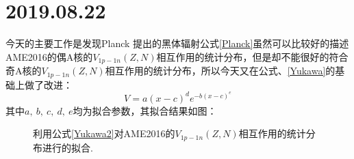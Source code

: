 \section{2019.08.22}
今天的主要工作是发现Planck 提出的黑体辐射公式\ref{Planck}虽然可以比较好的描述AME2016的偶A核的$V_{1p-1n}(Z,N)$相互作用的统计分布，但是却不能很好的符合奇A核的$V_{1p-1n}(Z,N)$相互作用的统计分布，所以今天又在公式、\ref{Yukawa}的基础上做了改进：
\begin{equation}
V=a(x-c)^de^{-b(x-c)^e}\label{Yukawa2}
\end{equation}
其中$a,~b,~c,~d,~e$均为拟合参数，其拟合结果如图：
\begin{figure}[H]
\centering
{}
\qquad
{}
\caption{利用公式\ref{Yukawa2}对AME2016的$V_{1p-1n}(Z,N)$相互作用的统计分布进行的拟合.\label{fig_Y3Fit}}
\end{figure}
